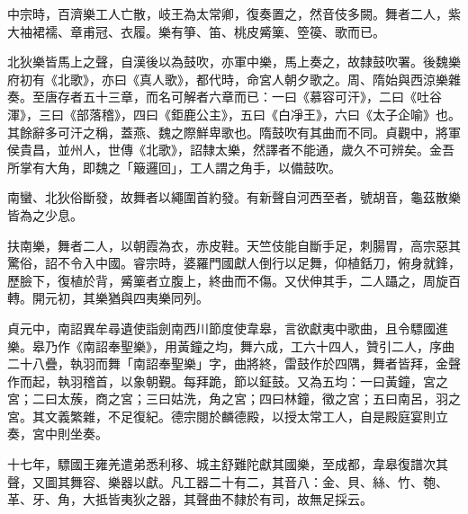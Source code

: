 \begin{pinyinscope}
 中宗時，百濟樂工人亡散，岐王為太常卿，復奏置之，然音伎多闕。舞者二人，紫大袖裙襦、章甫冠、衣履。樂有箏、笛、桃皮觱篥、箜篌、歌而已。



 北狄樂皆馬上之聲，自漢後以為鼓吹，亦軍中樂，馬上奏之，故隸鼓吹署。後魏樂府初有《北歌》，亦曰《真人歌》，都代時，命宮人朝夕歌之。周、隋始與西涼樂雜奏。至唐存者五十三章，而名可解者六章而已：一曰《慕容可汗》，二曰《吐谷渾》，三曰《部落稽》，四曰《鉅鹿公主》，五曰《白凈王》，六曰《太子企喻》也。其餘辭多可汗之稱，蓋燕、魏之際鮮卑歌也。隋鼓吹有其曲而不同。貞觀中，將軍侯貴昌，並州人，世傳《北歌》，詔隸太樂，然譯者不能通，歲久不可辨矣。金吾所掌有大角，即魏之「簸邏回」，工人謂之角手，以備鼓吹。



 南蠻、北狄俗斷發，故舞者以繩圍首約發。有新聲自河西至者，號胡音，龜茲散樂皆為之少息。



 扶南樂，舞者二人，以朝霞為衣，赤皮鞋。天竺伎能自斷手足，刺腸胃，高宗惡其驚俗，詔不令入中國。睿宗時，婆羅門國獻人倒行以足舞，仰植銛刀，俯身就鋒，歷臉下，復植於背，觱篥者立腹上，終曲而不傷。又伏伸其手，二人躡之，周旋百轉。開元初，其樂猶與四夷樂同列。



 貞元中，南詔異牟尋遺使詣劍南西川節度使韋皋，言欲獻夷中歌曲，且令驃國進樂。皋乃作《南詔奉聖樂》，用黃鐘之均，舞六成，工六十四人，贊引二人，序曲二十八疊，執羽而舞「南詔奉聖樂」字，曲將終，雷鼓作於四隅，舞者皆拜，金聲作而起，執羽稽首，以象朝覲。每拜跪，節以鉦鼓。又為五均：一曰黃鐘，宮之宮；二曰太蔟，商之宮；三曰姑洗，角之宮；四曰林鐘，徵之宮；五曰南呂，羽之宮。其文義繁雜，不足復紀。德宗閱於麟德殿，以授太常工人，自是殿庭宴則立奏，宮中則坐奏。



 十七年，驃國王雍羌遣弟悉利移、城主舒難陀獻其國樂，至成都，韋皋復譜次其聲，又圖其舞容、樂器以獻。凡工器二十有二，其音八：金、貝、絲、竹、匏、革、牙、角，大抵皆夷狄之器，其聲曲不隸於有司，故無足採云。



\end{pinyinscope}